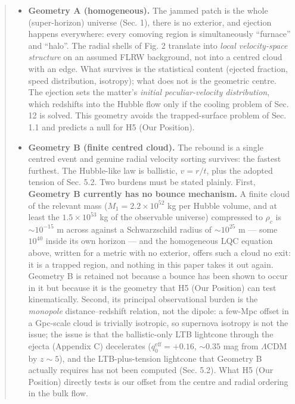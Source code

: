 \documentclass[
]{article}
\providecommand{\tightlist}{%
  \setlength{\itemsep}{0pt}\setlength{\parskip}{0pt}}
\begin{document}
\begin{quote}
\begin{itemize}
\tightlist
\item
  \textbf{Geometry A (homogeneous).} The jammed patch is the whole
  (super-horizon) universe (Sec. 1), there is no exterior, and ejection
  happens everywhere: every comoving region is simultaneously
  ``furnace'' and ``halo''. The radial shells of Fig. 2 translate into
  \emph{local velocity-space structure} on an assumed FLRW background,
  not into a centred cloud with an edge. What survives is the
  statistical content (ejected fraction, speed distribution, isotropy);
  what does not is the geometric centre. The ejection sets the matter's
  \emph{initial peculiar-velocity distribution}, which redshifts into
  the Hubble flow only if the cooling problem of Sec. 12 is solved. This
  geometry avoids the trapped-surface problem of Sec. 1.1 and predicts a
  null for H5 (Our Position).
\item
  \textbf{Geometry B (finite centred cloud).} The rebound is a single
  centred event and genuine radial velocity sorting survives: the
  fastest furthest. The Hubble-like law is ballistic, \(v = r/t\), plus
  the adopted tension of Sec. 5.2. Two burdens must be stated plainly.
  First, \textbf{Geometry B currently has no bounce mechanism.} A finite
  cloud of the relevant mass (\(M_1 = 2.2\times10^{52}\) kg per Hubble
  volume, and at least the \(1.5\times10^{53}\) kg of the observable
  universe) compressed to \(\rho_c\) is \(\sim\!10^{-15}\) m across
  against a Schwarzschild radius of \(\sim\!10^{25}\) m --- some
  \(10^{40}\) inside its own horizon --- and the homogeneous LQC
  equation above, written for a metric with no exterior, offers such a
  cloud no exit: it is a trapped region, and nothing in this paper takes
  it out again. Geometry B is retained not because a bounce has been
  shown to occur in it but because it is the geometry that H5 (Our
  Position) can test kinematically. Second, its principal observational
  burden is the \emph{monopole} distance--redshift relation, not the
  dipole: a few-Mpc offset in a Gpc-scale cloud is trivially isotropic,
  so supernova isotropy is not the issue; the issue is that the
  ballistic-only LTB lightcone through the ejecta (Appendix C)
  decelerates (\(q_0^{\text{eff}} = +0.16\), \(\sim\!0.35\) mag from
  \(\Lambda\)CDM by \(z \sim 5\)), and the LTB-plus-tension lightcone
  that Geometry B actually requires has not been computed (Sec. 5.2).
  What H5 (Our Position) directly tests is our offset from the centre
  and radial ordering in the bulk flow.
\end{itemize}
\end{quote}
\end{document}
